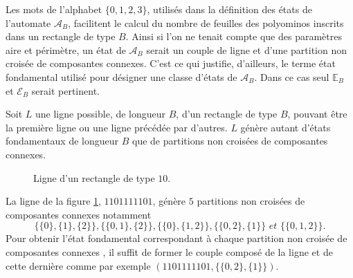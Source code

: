 \begin{Rem}\label{remd1}
Les mots de l'alphabet $\{0,1,2,3\}$, utilisés dans la définition des états  de l'automate $\mathcal{A}_{B}$, facilitent le calcul du nombre de feuilles des polyominos inscrits dans un rectangle de type $B$. Ainsi si l'on ne tenait compte que des paramètres aire et périmètre, un état de $\mathcal{A}_{B}$ serait un couple de ligne et d'une partition non croisée de composantes connexes. C'est ce qui justifie, d'ailleurs, le terme état fondamental utilisé pour désigner une classe d'états de $\mathcal{A}_{B}$. Dans ce cas seul  $\mathbb{E}_{B}$ et $\mathcal{E}_{B}$  serait pertinent. 
\end{Rem}
\begin{Rem}\label{rem1}
Soit $L$ une ligne possible, de longueur $B$, d'un rectangle de type $B$, pouvant être la première ligne ou une ligne précédée par d'autres.
 $L$ génère autant d'états  fondamentaux de longueur $B$ que de partitions non croisées de composantes connexes.
\end{Rem}
\begin{Ex}\label{exrec}
\begin{figure}[!htb]
\begin{minipage}[c]{.16\linewidth}
        \centering
\end{minipage}
\hfill
\begin{minipage}[c]{.66\linewidth}
        \centering
\begin{logicpuzzle}[rows=1,columns=10,color=cyan!100, width=750px,scale=0.5]
\framepuzzle[black!50]
\end{logicpuzzle}
\end{minipage}
\caption{\label{figclass} Ligne d'un rectangle de type $10$.}
\end{figure} 
La ligne de la figure \ref{figclass}, $1101111101$, génère $5$ partitions non croisées de composantes connexes  notamment $$\{\{0\},\{1\},\{2\}\}, \{\{0,1\},\{2\}\}, \{\{0\},\{1,2\}\}, \{\{0,2\},\{1\}\} \textit{ et }\{\{0,1,2\}\}.$$ Pour obtenir l'état fondamental correspondant à chaque partition non croisée de composantes connexes  , il suffit de former le couple composé de la ligne et de cette dernière comme par exemple $(1101111101,\{\{0,2\},\{1\}\})$.
\end{Ex}
